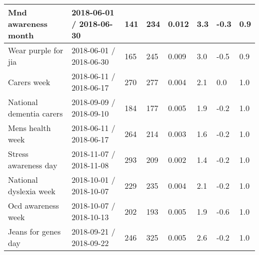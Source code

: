 \begin{tabularx}{\textwidth}{|X|p{1.8cm}|p{1.2cm}|p{1.1cm}|p{1.4cm}|p{1.2cm}|p{1.3cm}|p{1.1cm}|}
Mnd awareness month & 2018-06-01 / 2018-06-30 & 141 & 234 & 0.012 & 3.3 & -0.3 & 0.9 \\ \hline
Wear purple for jia & 2018-06-01 / 2018-06-30 & 165 & 245 & 0.009 & 3.0 & -0.5 & 0.9 \\ \hline
Carers week & 2018-06-11 / 2018-06-17 & 270 & 277 & 0.004 & 2.1 & 0.0 & 1.0 \\ \hline
National dementia carers & 2018-09-09 / 2018-09-10 & 184 & 177 & 0.005 & 1.9 & -0.2 & 1.0 \\ \hline
Mens health week & 2018-06-11 / 2018-06-17 & 264 & 214 & 0.003 & 1.6 & -0.2 & 1.0 \\ \hline
Stress awareness day & 2018-11-07 / 2018-11-08 & 293 & 209 & 0.002 & 1.4 & -0.2 & 1.0 \\ \hline
National dyslexia week & 2018-10-01 / 2018-10-07 & 229 & 235 & 0.004 & 2.1 & -0.2 & 1.0 \\ \hline
Ocd awareness week & 2018-10-07 / 2018-10-13 & 202 & 193 & 0.005 & 1.9 & -0.6 & 1.0 \\ \hline
Jeans for genes day & 2018-09-21 / 2018-09-22 & 246 & 325 & 0.005 & 2.6 & -0.2 & 1.0 \\ \hline

\end{tabularx}
